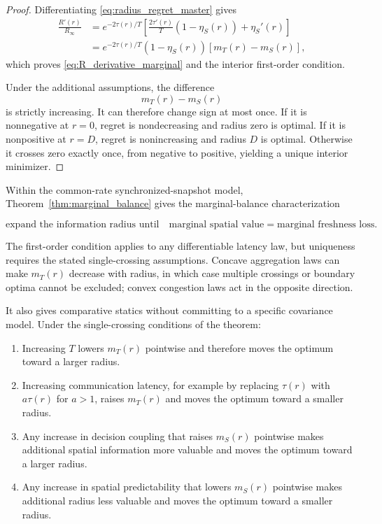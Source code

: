 \documentclass[11pt]{article}
\begin{document}
\begin{proof}
Differentiating \eqref{eq:radius_regret_master} gives
\begin{align}
    \frac{R'(r)}{R_\infty}
    &=
    e^{-2\tau(r)/T}
    \left[
        \frac{2\tau'(r)}{T}
        \left(
            1-\eta_S(r)
        \right)
        +
        \eta_S'(r)
    \right]
    \nonumber\\
    &=
    e^{-2\tau(r)/T}
    \left(
        1-\eta_S(r)
    \right)
    \left[
        m_T(r)-m_S(r)
    \right],
\end{align}
which proves \eqref{eq:R_derivative_marginal} and the interior first-order
condition.

Under the additional assumptions, the difference
\[
    m_T(r)-m_S(r)
\]
is strictly increasing. It can therefore change sign at most once. If it is
nonnegative at $r=0$, regret is nondecreasing and radius zero is optimal. If
it is nonpositive at $r=D$, regret is nonincreasing and radius $D$ is
optimal. Otherwise it crosses zero exactly once, from negative to positive,
yielding a unique interior minimizer.
\end{proof}

Within the common-rate synchronized-snapshot model,
Theorem~\ref{thm:marginal_balance} gives the marginal-balance characterization

\begin{equation}
    \boxed{
    \text{expand the information radius until}
    \quad
    \text{marginal spatial value}
    =
    \text{marginal freshness loss}.
    }
    \label{eq:verbal_marginal_rule}
\end{equation}

The first-order condition applies to any differentiable latency law, but
uniqueness requires the stated single-crossing assumptions. Concave aggregation
laws can make $m_T(r)$ decrease with radius, in which case multiple crossings
or boundary optima cannot be excluded; convex congestion laws act in the
opposite direction.

It also gives comparative statics without committing to a specific covariance
model. Under the single-crossing conditions of the theorem:

\begin{enumerate}
    \item Increasing $T$ lowers $m_T(r)$ pointwise and therefore moves the
    optimum toward a larger radius.

    \item Increasing communication latency, for example by replacing
    $\tau(r)$ with $a\tau(r)$ for $a>1$, raises $m_T(r)$ and moves the
    optimum toward a smaller radius.

    \item Any increase in decision coupling that raises $m_S(r)$ pointwise
    makes additional spatial information more valuable and moves the optimum
    toward a larger radius.

    \item Any increase in spatial predictability that lowers $m_S(r)$
    pointwise makes additional radius less valuable and moves the optimum
    toward a smaller radius.
\end{enumerate}
\end{document}
